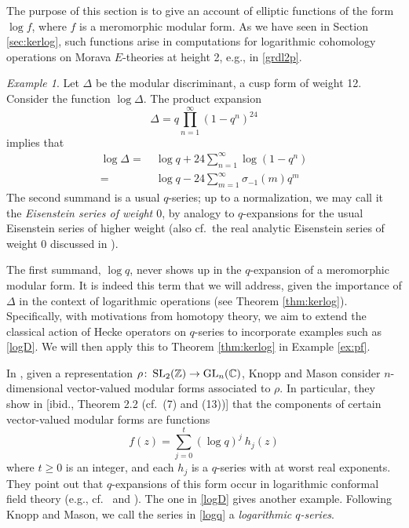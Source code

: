 \documentclass{gtpart}
\theoremstyle{definition}
\theoremstyle{remark}
\newtheorem{ex}[thm]{Example}
\def\co{\colon\thinspace}
\newcommand{\mb}[1]{\mathbb{#1}}
\newcommand{\BC}{{\mb C}}
\newcommand{\BZ}{{\mb Z}}
\renewcommand{\D}{\Delta}
\newcommand{\si}{\sigma}
\renewcommand{\=}{\approx}
\renewcommand{\-}{\sim}
\newcommand{\GL}{{\rm GL}}
\newcommand{\SL}{{\rm SL}}
\numberwithin{equation}{section}
\numberwithin{thm}{section}
\begin{document}
The purpose of this section is to give an account of elliptic functions of the form $\log f$, 
where $f$ is a meromorphic modular form.  
As we have seen in Section \ref{sec:kerlog}, such functions arise in computations 
for logarithmic cohomology operations on Morava $E$-theories at height 2, e.g., in \eqref{grdl2p}.  
\begin{ex}
 \label{ex:logD}
 Let $\D$ be the modular discriminant, a cusp form of weight 12.  
 Consider the function $\log \D$.  
 The product expansion 
 \[
  \D = q \prod_{n=1}^\infty (1 - q^n)^{24} 
 \]
 implies that 
 \begin{equation}
  \label{logD}
  \begin{split}
   \log \D = & ~ \log q + 24 \sum_{n=1}^\infty \log(1 - q^n) \\
           = & ~ \log q - 24 \sum_{m=1}^\infty \si_{-1}(m) q^m 
  \end{split}
 \end{equation}
 The second summand is a usual $q$-series; 
 up to a normalization, we may call it the {\em Eisenstein series of weight $0$}, 
 by analogy to $q$-expansions for the usual Eisenstein series of higher weight 
 (also cf.~the real analytic Eisenstein series of weight 0 discussed in \cite[Sections 3.3 and 4.1]{Funke}).  

 The first summand, $\log q$, never shows up in the $q$-expansion of a meromorphic modular form.  
 It is indeed this term that we will address, 
 given the importance of $\D$ in the context of logarithmic operations (see Theorem \ref{thm:kerlog}).  
 Specifically, with motivations from homotopy theory, 
 we aim to extend the classical action of Hecke operators on $q$-series to incorporate examples such as \eqref{logD}.  
 We will then apply this to Theorem \ref{thm:kerlog} in Example \ref{ex:pf}.  
\end{ex}

In \cite{KnoppMason}, given a representation $\rho \co \SL_2(\BZ) \to \GL_n(\BC)$, 
Knopp and Mason consider $n$-dimensional vector-valued modular forms associated to $\rho$.  
In particular, they show in [ibid., Theorem 2.2 (cf.~(7) and (13))] that the components of certain vector-valued modular forms are functions 
\begin{equation}
 \label{logq}
 f(z) = \sum_{j=0}^t (\log q)^j ~\! h_j(z) 
\end{equation}
where $t \geq 0$ is an integer, and each $h_j$ is a $q$-series with at worst real exponents.  
They point out that $q$-expansions of this form occur in logarithmic conformal field theory 
(e.g., cf.~\cite[(5.3.9)]{Zhu} and \cite[Proposition 4.5]{Miyamoto}).  
The one in \eqref{logD} gives another example.  
Following Knopp and Mason, we call the series in \eqref{logq} a {\em logarithmic $q$-series}.  
\end{document}
